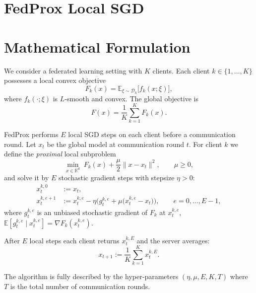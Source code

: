 \documentclass{article}
\begin{document}
\section*{FedProx Local SGD}

\section*{Mathematical Formulation}
We consider a federated learning setting with $K$ clients.  
Each client $k\in\{1,\dots,K\}$ possesses a local convex objective
\[
F_k(x)=\mathbb{E}_{\xi\sim\mathcal{D}_k}\big[ f_k(x;\xi)\big],
\]
where $f_k(\cdot;\xi)$ is $L$‑smooth and convex.  
The global objective is
\[
F(x)=\frac1K\sum_{k=1}^K F_k(x).
\]

FedProx performs $E$ local SGD steps on each client before a
communication round.  
Let $x_t$ be the global model at communication round $t$.
For client $k$ we define the \emph{proximal} local subproblem
\begin{equation}
\label{eq:prox}
\min_{x\in\mathbb{R}^d}\; 
F_k(x)+\frac{\mu}{2}\|x-x_t\|^2,
\qquad \mu\ge 0,
\end{equation}
and solve it by $E$ stochastic gradient steps with stepsize $\eta>0$:
\[
\begin{aligned}
x_{t}^{k,0}&:=x_t,\\
x_{t}^{k,e+1}&:=x_{t}^{k,e}
-\eta\Big(g_{t}^{k,e}+ \mu\big(x_{t}^{k,e}-x_t\big)\Big),
\qquad e=0,\dots,E-1,
\end{aligned}
\tag{Local Update}
\]
where $g_{t}^{k,e}$ is an unbiased stochastic gradient of $F_k$ at
$x_{t}^{k,e}$,
$\mathbb{E}[g_{t}^{k,e}\mid x_{t}^{k,e}]=\nabla F_k(x_{t}^{k,e})$.

After $E$ local steps each client returns $x_{t}^{k,E}$ and the server
averages:
\[
x_{t+1}:=\frac1K\sum_{k=1}^K x_{t}^{k,E}.
\tag{Aggregation}
\]

The algorithm is fully described by the hyper‑parameters
$(\eta,\mu,E,K,T)$ where $T$ is the total number of communication
rounds.
\end{document}
